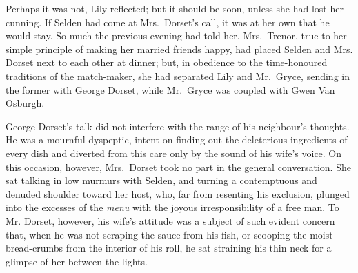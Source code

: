 \documentclass[12pt,a4paper]{book}
\begin{document}
Perhaps it was not, Lily reflected; but it should be soon, unless
she had lost her cunning. If Selden had come at Mrs.\ Dorset's
call, it was at her own that he would stay. So much the previous
evening had told her. Mrs.\ Trenor, true to her simple principle
of making her married friends happy, had placed Selden and Mrs.
Dorset next to each other at dinner; but, in obedience to the
time-honoured traditions of the match-maker, she had separated
Lily and Mr.\ Gryce, sending in the former with George
Dorset, while Mr.\ Gryce was coupled with Gwen Van Osburgh.





George Dorset's talk did not interfere with the range of his
neighbour's thoughts. He was a mournful dyspeptic, intent on
finding out the deleterious ingredients of every dish and
diverted from this care only by the sound of his wife's voice. On
this occasion, however, Mrs.\ Dorset took no part in the general
conversation. She sat talking in low murmurs with Selden, and
turning a contemptuous and denuded shoulder toward her host, who,
far from resenting his exclusion, plunged into the excesses of
the \textit{menu} with the joyous irresponsibility of a free man. To Mr.
Dorset, however, his wife's attitude was a subject of such
evident concern that, when he was not scraping the sauce from his
fish, or scooping the moist bread-crumbs from the interior of his
roll, he sat straining his thin neck for a glimpse of her between
the lights.
\end{document}
